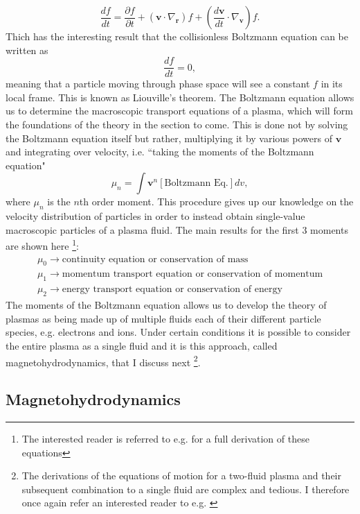 \begin{equation}
\label{eq:KT_Vlasov_convective}
\frac{df}{dt} = \frac{\partial f}{\partial t} + (\mathbf{v} \cdot \nabla_\mathbf{r})f + \left(\frac{d\mathbf{v}}{dt} \cdot \nabla_\mathbf{v}\right)f.
\end{equation}
Thich has the interesting result that the collisionless Boltzmann equation can be written as
\begin{equation}
\label{eq:KT_Liouville}
\frac{df}{dt}=0,
\end{equation}
meaning that a particle moving through phase space will see a constant $f$ in its local frame. This is known as Liouville's theorem. The Boltzmann equation allows us to determine the macroscopic transport equations of a plasma, which will form the foundations of the theory in the section to come. This is done not by solving the Boltzmann equation itself but rather, multiplying it by various powers of $\mathbf{v}$ and integrating over velocity, i.e. ``taking the moments of the Boltzmann equation"
$$
\mu_n = \int \mathbf{v}^n\left[\mbox{Boltzmann Eq.}\right]dv,
$$
where $\mu_n$ is the $n$th order moment. This procedure gives up our knowledge on the velocity distribution of particles in order to instead obtain single-value macroscopic particles of a plasma fluid. The main results for the first 3 moments are shown here \footnote{The interested reader is referred to e.g. \cite{Inan2010} for a full derivation of these equations}:
\begin{align*}
\mu_0 \rightarrow  \mbox{continuity equation or conservation of mass} \\
\mu_1 \rightarrow  \mbox{momentum transport equation or conservation of momentum} \\
\mu_2 \rightarrow  \mbox{energy transport equation or conservation of energy}
\end{align*}
The moments of the Boltzmann equation allows us to develop the theory of plasmas as being made up of multiple fluids each of their different particle species, e.g. electrons and ions. Under certain conditions it is possible to consider the entire plasma as a single fluid and it is this approach, called magnetohydrodynamics, that I discuss next \footnote{The derivations of the equations of motion for a two-fluid plasma and their subsequent combination to a single fluid are complex and tedious. I therefore once again refer an interested reader to e.g. \cite{Inan2010}}.
\subsection{Magnetohydrodynamics}
